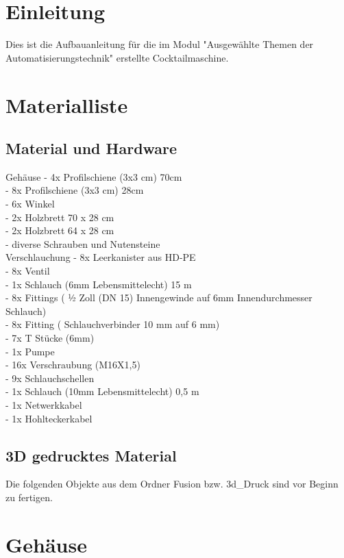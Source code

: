 \documentclass[10pt,a4paper]{report}
\begin{document}
	\chapter{Einleitung}
	Dies ist die Aufbauanleitung für die im Modul "Ausgewählte Themen der Automatisierungstechnik" erstellte Cocktailmaschine.
	
	\chapter{Materialliste}
	\section{Material und Hardware}
	Gehäuse
	- 4x Profilschiene (3x3 cm) 70cm\\
	- 8x Profilschiene (3x3 cm) 28cm\\
	- 6x Winkel\\
	- 2x Holzbrett 70 x 28 cm\\ 
	- 2x Holzbrett 64 x 28 cm\\
	- diverse Schrauben und Nutensteine\\
	Verschlauchung
	- 8x Leerkanister aus HD-PE\\
	- 8x Ventil\\
	- 1x Schlauch (6mm Lebensmittelecht) 15 m\\
	- 8x Fittings ( ½ Zoll (DN 15) Innengewinde auf 6mm Innendurchmesser Schlauch)\\
	- 8x Fitting ( Schlauchverbinder 10 mm auf 6 mm)\\
	- 7x T Stücke (6mm)\\
	- 1x Pumpe\\
	- 16x Verschraubung (M16X1,5)\\
	- 9x Schlauchschellen\\
	- 1x Schlauch (10mm Lebensmittelecht) 0,5 m\\
	
	- 1x Netwerkkabel \\
	- 1x Hohlteckerkabel\\
		
		
	\section{3D gedrucktes Material}
	Die folgenden Objekte aus dem Ordner Fusion bzw. 3d\_Druck sind vor Beginn zu fertigen.
	

	\chapter{Gehäuse}
\end{document}
